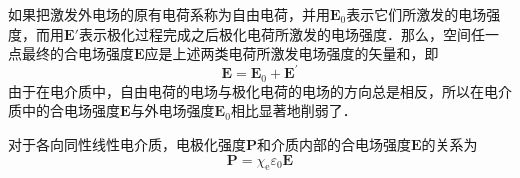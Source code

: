 

如果把激发外电场的原有电荷系称为自由电荷，并用$\mathbf E_0$表示它们所激发的电场强度，而用$\mathbf E'$表示极化过程完成之后极化电荷所激发的电场强度．那么，空间任一点最终的合电场强度$\mathbf E $应是上述两类电荷所激发电场强度的矢量和，即
\begin{equation}
\mathbf E=\mathbf E_{0}+\mathbf E^{\prime}
\end{equation}
由于在电介质中，自由电荷的电场与极化电荷的电场的方向总是相反，所以在电介质中的合电场强度$\mathbf E $与外电场强度$\mathbf E_0$相比显著地削弱了．

对于各向同性线性电介质，电极化强度$\mathbf P $和介质内部的合电场强度$\mathbf E $的关系为
\begin{equation}
\mathbf P=\chi_{\mathrm e} \varepsilon_{0} \mathbf E
\end{equation}